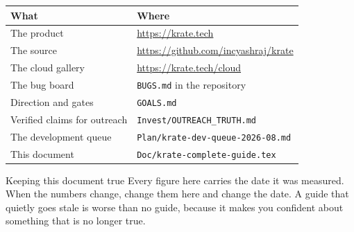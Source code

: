 \documentclass[11pt,a4paper]{report}
\begin{document}
\begin{center}
\begin{tabular}{lp{9cm}}
\toprule
\textbf{What} & \textbf{Where} \\
\midrule
The product & \url{https://krate.tech} \\
The source & \url{https://github.com/incyashraj/krate} \\
The cloud gallery & \url{https://krate.tech/cloud} \\
The bug board & \texttt{BUGS.md} in the repository \\
Direction and gates & \texttt{GOALS.md} \\
Verified claims for outreach & \texttt{Invest/OUTREACH\_TRUTH.md} \\
The development queue & \texttt{Plan/krate-dev-queue-2026-08.md} \\
This document & \texttt{Doc/krate-complete-guide.tex} \\
\bottomrule
\end{tabular}
\end{center}

\vspace{1cm}
\begin{factbox}{Keeping this document true}
Every figure here carries the date it was measured. When the numbers
change, change them here and change the date. A guide that quietly goes
stale is worse than no guide, because it makes you confident about
something that is no longer true.
\end{factbox}
\end{document}
